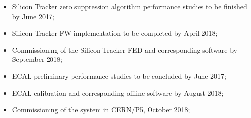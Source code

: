 \begin{itemize}
\item Silicon Tracker zero suppression algorithm performance studies to be finished by June 2017; 

\item Silicon Tracker FW implementation to be completed by April 2018; 

\item Commissioning of the Silicon Tracker FED and corresponding software by September 2018; 

\item ECAL preliminary performance studies to be concluded by June 2017;
 
\item ECAL calibration and corresponding offline software by August 2018;  \

\item Commissioning of the system in CERN/P5, October 2018;
\end{itemize}

